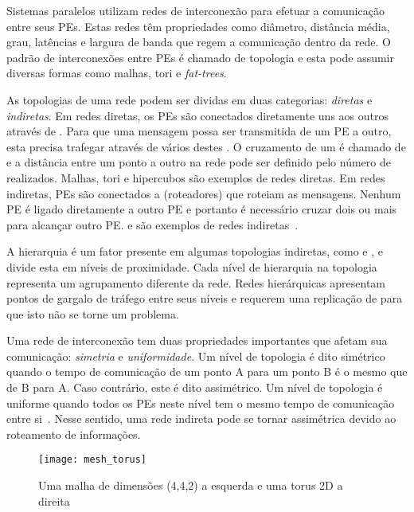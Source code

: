 Sistemas paralelos utilizam redes de interconexão para efetuar a comunicação entre seus PEs. 
Estas redes têm propriedades como diâmetro, distância média, grau, latências e largura de banda que regem a comunicação dentro da rede. 
O padrão de interconexões entre PEs é chamado de topologia e esta pode assumir diversas formas como malhas, tori e \textit{fat-trees}.

As topologias de uma rede podem ser dividas em duas categorias: \textit{diretas} e \textit{indiretas}. 
Em redes diretas, os PEs são conectados diretamente  uns aos outros através de \links. Para que uma mensagem possa ser transmitida de um PE a outro, esta precisa trafegar através de vários destes \links.
O cruzamento de um \link é chamado de \hop e a distância entre um ponto a outro na rede pode ser definido pelo número de \hops realizados. 
Malhas, tori e hipercubos são exemplos de redes diretas. 
Em redes indiretas, PEs são conectados a \switches (roteadores) que roteiam as mensagens. Nenhum PE é ligado diretamente a outro PE e portanto é necessário cruzar dois ou mais \switches para alcançar outro PE. 
\Fatts e \dgfly são exemplos de redes indiretas~\cite{bhatele-encyclopedia}.

A hierarquia é um fator presente em algumas topologias indiretas, como \fatt e \dgfly, e divide esta em níveis de proximidade. 
Cada nível de hierarquia na topologia representa um agrupamento diferente da rede. 
Redes hierárquicas apresentam pontos de gargalo de tráfego entre seus níveis e requerem uma replicação de \links para que isto não se torne um problema.

Uma rede de interconexão tem duas propriedades importantes que afetam sua comunicação: \textit{simetria} e \textit{uniformidade}. 
Um nível de topologia é dito simétrico quando o tempo de comunicação de um ponto A para um ponto B é o mesmo que de B para A. Caso contrário, este é dito assimétrico. 
Um nível de topologia é uniforme quando todos os PEs neste nível tem o mesmo tempo de comunicação entre si~\cite{pilla-thesis}. 
Nesse sentido, uma rede indireta pode se tornar assimétrica devido ao roteamento de informações. 

\begin{figure} [b]
\texttt{[image: mesh\_torus]}
\centering
\caption[Uma malha de dimensões (4,4,2) e uma torus 2D]{Uma malha de dimensões (4,4,2) a esquerda e uma torus 2D a direita~\cite{bhatele-encyclopedia}}
\label{fig:mesh_torus}
\end{figure}

